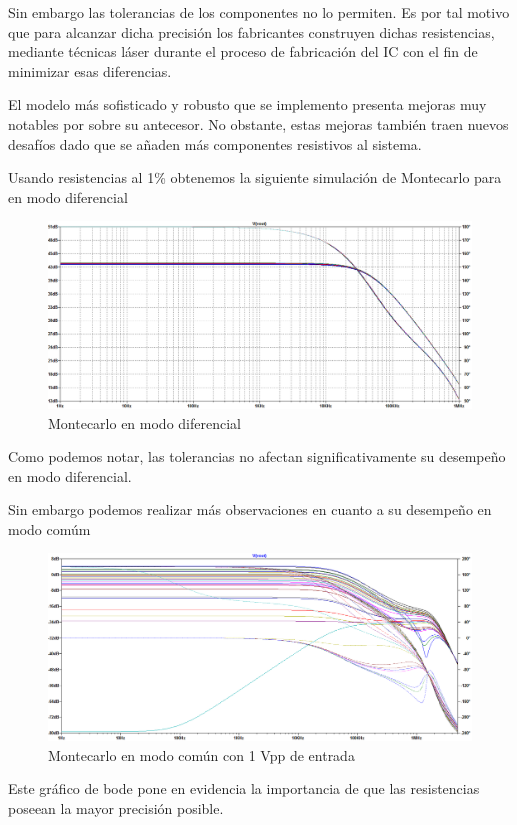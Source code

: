 \documentclass[a4paper]{article}
\begin{document}
Sin embargo las tolerancias de los componentes no lo permiten. Es por tal motivo que para alcanzar dicha precisión los fabricantes construyen dichas resistencias, mediante técnicas láser durante el proceso de fabricación del IC con el fin de minimizar esas diferencias.

El modelo más sofisticado y robusto que se implemento presenta mejoras muy notables por sobre su antecesor. No obstante, estas mejoras también traen nuevos desafíos dado que se añaden más componentes resistivos al sistema.

Usando resistencias al 1\% obtenemos la siguiente simulación de Montecarlo para en modo diferencial

\begin{figure}[H]
	\centering
	\includegraphics[width=\textwidth]{../ImagenesDeSimulaciones/MonteCarloModoDiferencialGrande.png}
	\caption{Montecarlo en modo diferencial}
\end{figure}  
Como podemos notar, las tolerancias no afectan significativamente su desempeño en modo diferencial.

Sin embargo podemos realizar más observaciones en cuanto a su desempeño en modo comúm
\begin{figure}[H]
	\centering
	\includegraphics[height=0.3\textheight]{../ImagenesDeSimulaciones/MonteCarloModoComunGrande1V.png}
	\caption{Montecarlo en modo común con 1 Vpp de entrada}
\end{figure} 
Este gráfico de bode pone en evidencia la importancia de que las resistencias poseean la mayor precisión posible.
\end{document}
